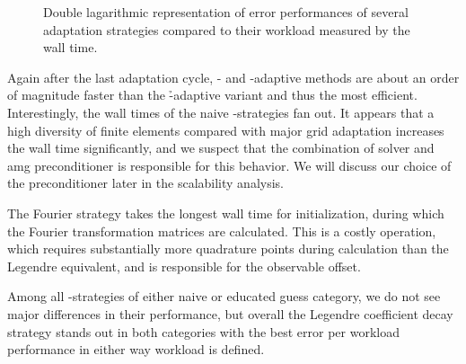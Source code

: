 \begin{figure}
\centering
%
%  
\caption{Double lagarithmic representation of error performances of several adaptation strategies compared to their workload measured by the wall time.}
\label{fig:errorwalltime}
\end{figure}


Again after the last adaptation cycle, \p- and \hp-adaptive methods are about an order of magnitude faster than the \h-adaptive variant and thus the most efficient. Interestingly, the wall times of the naive \hp-strategies fan out. It appears that a high diversity of finite elements compared with major grid adaptation increases the wall time significantly, and we suspect that the combination of solver and \gls{amg} preconditioner is responsible for this behavior. We will discuss our choice of the preconditioner later in the scalability analysis.

The Fourier strategy takes the longest wall time for initialization, during which the Fourier transformation matrices are calculated. This is a costly operation, which requires substantially more quadrature points during calculation than the Legendre equivalent, and is responsible for the observable offset.

Among all \hp-strategies of either naive or educated guess category, we do not see major differences in their performance, but overall the Legendre coefficient decay strategy stands out in both categories with the best error per workload performance in either way workload is defined.

